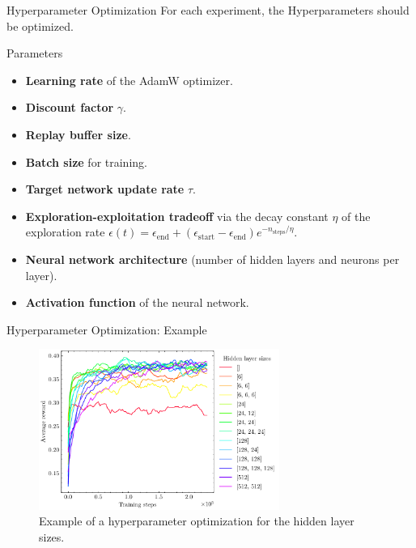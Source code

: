 \documentclass[10pt,xcolor=table, aspectratio=1610]{beamer}
\begin{document}
\begin{frame}{Hyperparameter Optimization}
  For each experiment, the Hyperparameters should be optimized. 
    \begin{block}{Parameters}
      \begin{itemize}
        \item \textbf{Learning rate} of the AdamW optimizer.
        \item \textbf{Discount factor} $\gamma$.
        \item \textbf{Replay buffer size}.
        \item \textbf{Batch size} for training.
        \item \textbf{Target network update rate} $\tau$.
        \item \textbf{Exploration-exploitation tradeoff} via the decay constant $\eta$ of the exploration rate $\epsilon(t)=\epsilon_{\text{end}} + (\epsilon_{\text{start}} - \epsilon_{\text{end}}) e^{-n_{\text{steps}}/\eta}$.
        \item \textbf{Neural network architecture} (number of hidden layers and neurons per layer).
        \item \textbf{Activation function} of the neural network.
    \end{itemize}
    \end{block}
\end{frame}

\begin{frame}{Hyperparameter Optimization: Example}
  \begin{figure}
    \includegraphics[width=0.7\textwidth]{img/hyperparam_optim_hidden_layer_sizes.pdf}
    \caption*{\hspace{2cm} Example of a hyperparameter optimization for the hidden layer sizes.}
  \end{figure}
\end{frame}
\end{document}
